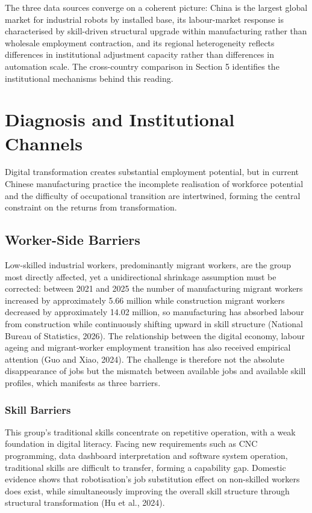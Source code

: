\documentclass[12pt]{article}
\begin{document}
The three data sources converge on a coherent picture: China is the largest global market for industrial robots by installed base, its labour-market response is characterised by skill-driven structural upgrade within manufacturing rather than wholesale employment contraction, and its regional heterogeneity reflects differences in institutional adjustment capacity rather than differences in automation scale. The cross-country comparison in Section 5 identifies the institutional mechanisms behind this reading.

\section{Diagnosis and Institutional Channels}

Digital transformation creates substantial employment potential, but in current Chinese manufacturing practice the incomplete realisation of workforce potential and the difficulty of occupational transition are intertwined, forming the central constraint on the returns from transformation.

\subsection{Worker-Side Barriers}

Low-skilled industrial workers, predominantly migrant workers, are the group most directly affected, yet a unidirectional shrinkage assumption must be corrected: between 2021 and 2025 the number of manufacturing migrant workers increased by approximately 5.66 million while construction migrant workers decreased by approximately 14.02 million, so manufacturing has absorbed labour from construction while continuously shifting upward in skill structure (National Bureau of Statistics, 2026). The relationship between the digital economy, labour ageing and migrant-worker employment transition has also received empirical attention (Guo and Xiao, 2024). The challenge is therefore not the absolute disappearance of jobs but the mismatch between available jobs and available skill profiles, which manifests as three barriers.

\subsubsection{Skill Barriers}

This group's traditional skills concentrate on repetitive operation, with a weak foundation in digital literacy. Facing new requirements such as CNC programming, data dashboard interpretation and software system operation, traditional skills are difficult to transfer, forming a capability gap. Domestic evidence shows that robotisation's job substitution effect on non-skilled workers does exist, while simultaneously improving the overall skill structure through structural transformation (Hu et al., 2024).
\end{document}
